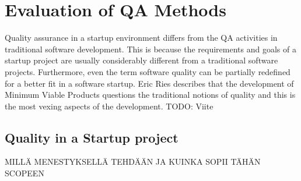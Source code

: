 
 \section{Evaluation of QA Methods}

Quality assurance in a startup environment differs from the QA activities in traditional software development. This is because the requirements and goals of a startup project are usually considerably different from a traditional software projects. Furthermore, even the term software quality can be partially redefined for a better fit in a software startup. Eric Ries describes that the development of Minimum Viable Products questions the traditional notions of quality and this is the most vexing aspects of the development. TODO: Viite
 
 \subsection{Quality in a Startup project}








% 















MILLÄ MENESTYKSELLÄ TEHDÄÄN JA KUINKA SOPII TÄHÄN SCOPEEN



